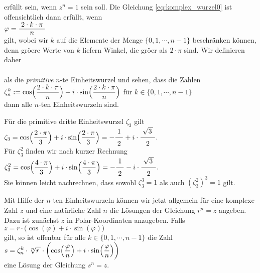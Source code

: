 erf\"{u}llt sein, wenn $z^n = 1$ sein soll.  Die Gleichung \ref{eq:komplex_wurzel0} ist offensichtlich dann
erf\"{u}llt, wenn 
\\[0.2cm]
\hspace*{1.3cm}
$\varphi = \bruch{2 \cdot k \cdot \pi}{n}$
\\[0.2cm]
gilt, wobei wir $k$ auf die Elemente der Menge $\{0,1, \cdots, n-1\}$ beschr\"{a}nken k\"{o}nnen, denn gr\"{o}\3ere
Werte von $k$ liefern Winkel, die gr\"{o}\3er als $2 \cdot \pi$ sind.  Wir definieren daher
\\[0.2cm]
\hspace*{1.3cm}
\colorbox{red}{}
\\[0.2cm]
als die \emph{primitive} $n$-te Einheitswurzel und sehen, dass die Zahlen
\\[0.2cm]
\hspace*{1.3cm}
$\displaystyle\zeta_n^k := \cos\Bigl(\frac{2 \cdot k \cdot \pi}{n}\Bigr) + i \cdot \sin\Bigl(\frac{2 \cdot k \cdot \pi}{n}\Bigr)$
\quad f\"{u}r $k \in \{ 0, 1, \cdots, n-1 \}$
\\[0.2cm]
dann alle $n$-ten Einheitswurzeln sind.

\example
F\"{u}r die primitive dritte Einheitswurzel $\zeta_3$ gilt
\\[0.2cm]
\hspace*{1.3cm}
$\ds\zeta_3 = \cos\Bigl(\frac{2 \cdot \pi}{3}\Bigr) + i \cdot \sin\Bigl(\frac{2 \cdot \pi}{3}\Bigr)
 = - \bruch{1}{2} + i \cdot \bruch{\sqrt{3\,}}{2}. 
$
\\[0.2cm] 
F\"{u}r $\zeta_3^2$ finden wir nach kurzer Rechnung
\\[0.2cm]
\hspace*{1.3cm}
$\ds\zeta_3^2 = \cos\Bigl(\frac{4 \cdot \pi}{3}\Bigr) + i \cdot \sin\Bigl(\frac{4 \cdot \pi}{3}\Bigr)
 = - \bruch{1}{2} - i \cdot \bruch{\sqrt{3\,}}{2}. 
$
\\[0.2cm]
Sie k\"{o}nnen leicht nachrechnen, dass sowohl $\zeta_3^3 = 1$ als auch $(\zeta_3^2)^3 = 1$ gilt.
\vspace*{0.2cm}

Mit Hilfe der $n$-ten Einheitswurzeln k\"{o}nnen wir jetzt allgemein f\"{u}r eine komplexe Zahl $z$ und eine
nat\"{u}rliche Zahl $n$ die L\"{o}sungen der Gleichung $r^n = z$ angeben.  Dazu ist zun\"{a}chst $z$ in
Polar-Koordinaten anzugeben.  Falls
\\[0.2cm]
\hspace*{1.3cm}
$z = r \cdot \bigl(\cos(\varphi) + i \cdot \sin(\varphi)\bigr)$
\\[0.2cm]
gilt, so ist offenbar f\"{u}r alle $k \in \{ 0, 1, \cdots, n - 1 \}$ die Zahl
\\[0.2cm]
\hspace*{1.3cm}
$\displaystyle s = \zeta_n^k \cdot \sqrt[n]{r\,} \cdot 
     \biggl(\cos\Bigl(\frac{\varphi}{n}\Bigr) + i \cdot \sin\Bigl(\frac{\varphi}{n}\Bigr) \biggr)
$
\\[0.2cm] 
eine L\"{o}sung der Gleichung $s^n = z$.

